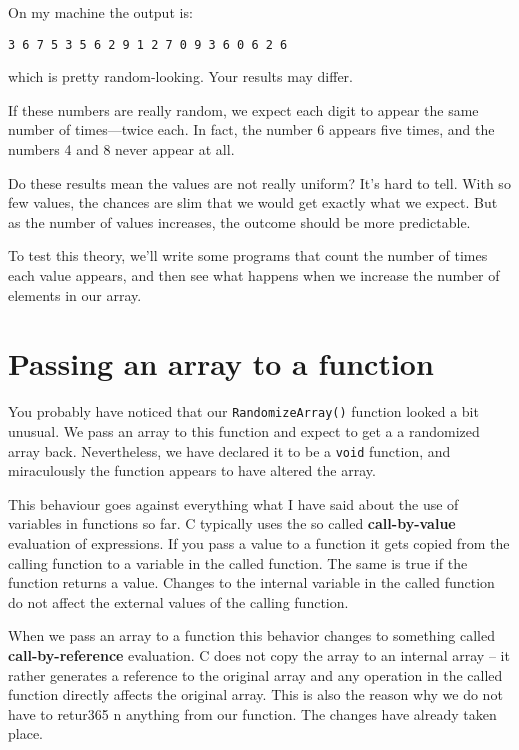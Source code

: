 %
On my machine the output is:

\begin{verbatim}
3 6 7 5 3 5 6 2 9 1 2 7 0 9 3 6 0 6 2 6 
\end{verbatim}
\nopagebreak%
which is pretty random-looking.  Your results may differ.

If these numbers are really random,
we expect each digit to appear the same number of times---twice
each.  In fact, the number 6 appears five times, and the numbers 4
and 8 never appear at all.

Do these results mean the values are not really uniform?  It's
hard to tell.  With so few values, the chances are slim
that we would get exactly what we expect.  But as the number
of values increases, the outcome should be more predictable.

To test this theory, we'll write some programs that count the
number of times each value appears, and then see what happens
when we increase the number of elements in our array.

\section{Passing an array to a function}
\label{Passing an array to a function}
You probably have noticed that our {\tt RandomizeArray()} function 
looked a bit unusual. We pass an array to this function and expect 
to get a a randomized array back. Nevertheless, we have declared it to 
be a {\tt void} function, and miraculously the function appears to have 
altered the array.

This behaviour goes against everything what I have said about the
use of variables in functions so far.
C typically uses the so called {\bf call-by-value} evaluation of
expressions. If you pass a value to a function it gets copied from
the calling function to a variable in the called function. The same
is true if the function returns a value.
Changes to the internal variable in the called function do not affect the external 
values of the calling function.

When we pass an array to a function this behavior changes to
something called {\bf call-by-reference} evaluation.
C does not copy the array to an internal array --  it rather generates a
reference to the original array and any operation in the called function 
directly affects the original array.
This is also the reason why we do not have to retur365
\label{key}n anything from our 
function. The changes have already taken place. 

